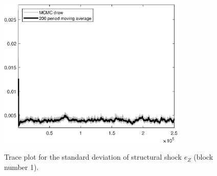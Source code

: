 \begin{figure}[H]
\centering
  \includegraphics[width=0.8\textwidth]{BRS_fd/graphs/TracePlot_SE_e_Z_blck_1}\\
    \caption{Trace plot for the standard deviation of structural shock ${e_Z}$ (block number 1).}
\end{figure}
